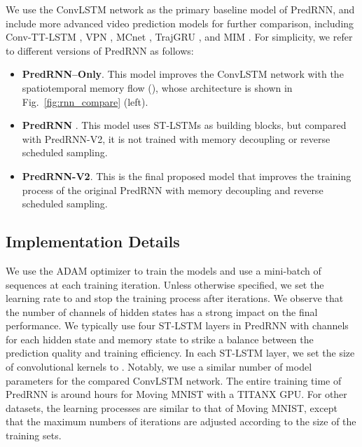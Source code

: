 \documentclass[10pt,journal,compsoc]{IEEEtran}
\newcommand{\fig}[1]{Fig.~\ref{#1}}
\begin{document}
We use the ConvLSTM network \cite{shi2015convolutional} as the primary baseline model of PredRNN, and include more advanced video prediction models for further comparison, including Conv-TT-LSTM \cite{su2020convolutional}, VPN \cite{Kalchbrenner2016Video}, MCnet \cite{Villegas2017Decomposing}, TrajGRU \cite{shi2017deep}, and MIM \cite{wang2019memory}.
For simplicity, we refer to different versions of PredRNN as follows:
\begin{itemize}
    \item \textbf{PredRNN--Only}. This model improves the ConvLSTM network with the spatiotemporal memory flow (), whose architecture is shown in \fig{fig:rnn_compare} (left).
    \item \textbf{PredRNN} \cite{wang2017predrnn}. This model uses ST-LSTMs as building blocks, but compared with PredRNN-V2, it is not trained with memory decoupling or reverse scheduled sampling.
    \item \textbf{PredRNN-V2}. This is the final proposed model that improves the training process of the original PredRNN with memory decoupling and reverse scheduled sampling.
\end{itemize}



\subsection{Implementation Details} 

We use the ADAM optimizer \cite{Kingma2014Adam} to train the models and use a mini-batch of  sequences at each training iteration. 
Unless otherwise specified, we set the learning rate to  and stop the training process after  iterations.
We observe that the number of channels of hidden states has a strong impact on the final performance.
We typically use four ST-LSTM layers in PredRNN with  channels for each hidden state and memory state to strike a balance between the prediction quality and training efficiency.
In each ST-LSTM layer, we set the size of convolutional kernels to . 
Notably, we use a similar number of model parameters for the compared ConvLSTM network.
The entire training time of PredRNN is around  hours for Moving MNIST with a TITANX GPU.
For other datasets, the learning processes are similar to that of Moving MNIST, except that the maximum numbers of iterations are adjusted according to the size of the training sets.
\end{document}
